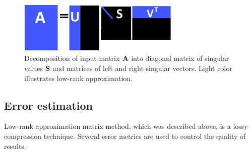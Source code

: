 \begin{figure}[H]
\centering
\includegraphics[width=0.7\textwidth]{figures/chapter-SVD/low_rank_decomposition_diagram}
\decoRule
\caption[Singular value decomposition illustration.]{Decomposition of input matrix $\mathbf{A}$ into diagonal matrix of singular values $\mathbf{S}$ and matrices of left and right singular vectors. Light color illustrates low-rank approximation.}
\label{fig:lowrank_svd}
\end{figure}

\subsection{Error estimation}
\label{sec:error-estimation}

Low-rank approximation matrix method, which was described above, is a lossy compression technique. Several error metrics are used to control the quality of results.

